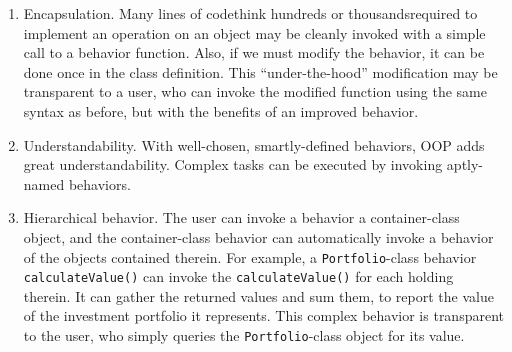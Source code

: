 \begin{enumerate}
\item Encapsulation. Many lines of code\textemdash think hundreds or thousands\textemdash required to implement an operation on an object may be cleanly invoked with a simple call to a behavior function. Also, if we must modify the behavior, it can be done once in the class definition. This ``under-the-hood'' modification may be transparent to a user, who can invoke the modified function using the same syntax as before, but with the benefits of an improved behavior.

\item Understandability. With well-chosen, smartly-defined behaviors, OOP adds great understandability. Complex tasks can be executed by invoking aptly-named behaviors.

\item Hierarchical behavior. The user can invoke a behavior a container-class object, and the container-class behavior can automatically invoke a behavior of the objects contained therein. For example, a \texttt{Portfolio}-class behavior \texttt{calculateValue()} can invoke the \texttt{calculateValue()} for each holding therein. It can gather the returned values and sum them, to report the value of the investment portfolio it represents. This complex behavior is transparent to the user, who simply queries the \texttt{Portfolio}-class object for its value.
\end{enumerate}
